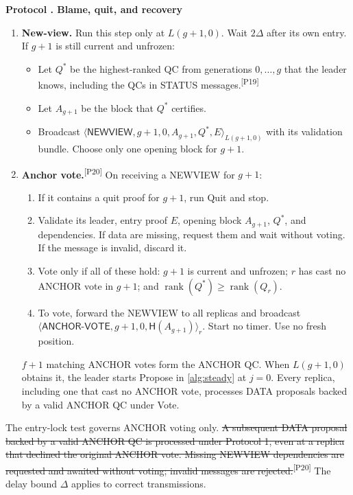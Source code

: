 \documentclass[11pt,a4paper]{article}
\newcommand{\RR}[1]{{\color{rrRed}#1}}
\newcommand{\NEW}[1]{{\color{diffNew}#1}}
\newcommand{\DEL}[1]{{\color{diffDel}\sout{#1}}}
\newcommand{\CH}[1]{\textsuperscript{\color{diffNew}\sffamily\scriptsize[#1]}}
\newcommand{\NEW}[1]{#1}
\newcommand{\DEL}[1]{}
\newcommand{\CH}[1]{}
\newcommand{\Hash}{\mathsf H}
\newcommand{\rank}{\operatorname{rank}}
\newcommand{\tagg}[1]{\ensuremath{\mathsf{#1}}}
\newcounter{protocol}
\newenvironment{protocol}[2]{\refstepcounter{protocol}\label{#1}
\begin{mdframed}[nobreak=true,linewidth=.6pt,skipabove=8pt,skipbelow=8pt,
innertopmargin=7pt,innerbottommargin=7pt]\small
\textbf{Protocol \theprotocol. #2}\par\smallskip}{\end{mdframed}}
\begin{document}
\begin{protocol}{alg:recovery}{Blame, quit, and recovery}
\begin{enumerate}[label=\textbf{\arabic*)},itemsep=5pt]
\item \textbf{New-view.} Run this step only at $L(g+1,0)$. Wait $2\Delta$
after its own entry. If $g+1$ is still current and unfrozen:
 \begin{itemize}
 \item Let $Q^*$ be the highest-ranked QC from generations $0,\ldots,g$
       that the leader knows\NEW{, including the QCs in STATUS
       messages}.\CH{P19}
 \item Let \NEW{$A_{g+1}$} be the block that $Q^*$ certifies.
 \item Broadcast
       $\langle\tagg{NEWVIEW},g+1,0,A_{g+1},Q^*,E\rangle_{L(g+1,0)}$
       with its validation bundle. \RR{Choose only one opening block for
       $g+1$.}
 \end{itemize}

\item \textbf{\NEW{Anchor vote}.}\CH{P20} On receiving a NEWVIEW for $g+1$:
 \begin{enumerate}[label=(\alph*)]
 \item \RR{If it contains a quit proof for $g+1$, run Quit and stop.}
 \item Validate its leader, entry proof $E$, opening block $A_{g+1}$,
       $Q^*$, and dependencies. \NEW{If data are missing, request them and
       wait without voting. If the message is invalid, discard it.}
 \item Vote only if all of these hold: $g+1$ is current and unfrozen; $r$
       has cast no ANCHOR vote in $g+1$; and $\rank(Q^*)\ge\rank(Q_r)$.
 \item To vote, forward the NEWVIEW to all replicas and broadcast
       $\langle\tagg{ANCHOR\mbox{-}VOTE},g+1,0,\Hash(A_{g+1})\rangle_r$.
       \RR{Start no timer. Use no fresh position.}
 \end{enumerate}
 \NEW{$f+1$ matching ANCHOR votes form the ANCHOR QC.} When $L(g+1,0)$
 obtains it, the leader \NEW{starts} Propose \RR{in \cref{alg:steady} at
 $j=0$}. \NEW{Every replica, including one that cast no ANCHOR vote,
 processes DATA proposals backed by a valid ANCHOR QC under Vote.}
\end{enumerate}
\end{protocol}

The entry-lock test governs ANCHOR voting only.
\DEL{A subsequent DATA proposal backed by a valid ANCHOR QC is processed
under Protocol 1, even at a replica that declined the original ANCHOR
vote. Missing NEWVIEW dependencies are requested and awaited without
voting; invalid messages are rejected.}\CH{P20}
The \NEW{delay bound $\Delta$} applies to correct transmissions.
\end{document}
